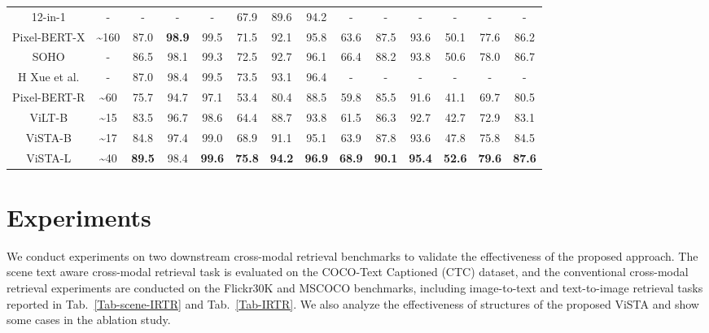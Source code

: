 \documentclass[10pt,twocolumn,letterpaper]{article}
\begin{document}
\begin{table*}[thb]
{\begin{tabular}{c|c|cccccc|cccccc}
12-in-1 \cite{12-in-1}  & -  &   -   &   -   &     - &   67.9   &   89.6   &     94.2   &    - &    -  &    -    &   -   &   -   &  -  \\


Pixel-BERT-X \cite{Pixel-BERT}     & \textasciitilde{}160   &  87.0 & \bf{98.9} & 99.5     &   71.5 & 92.1 & 95.8    &  63.6 & 87.5 & 93.6      &    50.1 & 77.6 & 86.2    \\
SOHO \cite{SOHO}  & -  &  86.5 & 98.1 & 99.3  &  72.5 & 92.7 & 96.1   &  66.4 & 88.2 & 93.8  & 50.6 & 78.0 & 86.7     \\
H Xue et al.\cite{xue2021probing}  & -  &   87.0  & 98.4   &  99.5 &  73.5  &  93.1   &  96.4  &    -  &    -  &    -    &   -   &   -   &  -  \\

Pixel-BERT-R \cite{Pixel-BERT}   &  \textasciitilde{}60 & 75.7  & 94.7  & 97.1 &53.4 & 80.4 & 88.5   &  59.8    &  85.5    &91.6  &41.1     & 69.7    & 80.5      \\

ViLT-B \cite{ViLT}             & \textasciitilde{}15       & 83.5 & 96.7 & 98.6   & 64.4   & 88.7 & 93.8   & 61.5 & 86.3 & 92.7  & 42.7 & 72.9   & 83.1    \\
\hline
ViSTA-B  & \textasciitilde{}17  &  84.8 & 97.4 & 99.0 & 68.9 & 91.1 & 95.1 &    63.9 &  87.8 & 93.6 & 47.8 & 75.8 & 84.5 \\
ViSTA-L & \textasciitilde{}40 & \bf{89.5} & 98.4 & \bf{99.6} & \bf{75.8} & \bf{94.2} & \bf{96.9} & \bf{68.9} & \bf{90.1} & \bf{95.4} & \bf{52.6} & \bf{79.6} & \bf{87.6} \\
\hline
\end{tabular}}
\end{table*}


\section{Experiments}
We conduct experiments on two downstream cross-modal retrieval benchmarks to validate the effectiveness of the proposed approach. The scene text aware cross-modal retrieval task is evaluated on the COCO-Text Captioned (CTC) \cite{STARNet} dataset, and the conventional cross-modal retrieval experiments are conducted on the Flickr30K \cite{flickr30k} and MSCOCO \cite{MS-COCO-5K} benchmarks, including image-to-text and text-to-image retrieval tasks reported in Tab.~\ref{Tab-scene-IRTR} and Tab.~\ref{Tab-IRTR}. We also analyze the effectiveness of structures of the proposed ViSTA and show some 
cases in the ablation study.
\end{document}
